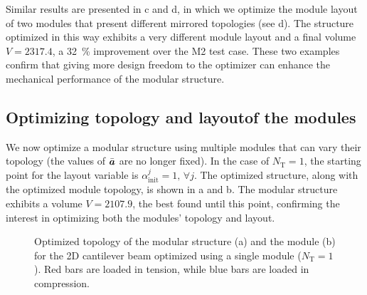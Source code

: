 Similar results are presented in c and d, in which we optimize the module layout of two modules that present different mirrored topologies (see d). The structure optimized in this way exhibits a very different module layout and a final volume $V = 2317.4$, a \qty{32}{\%} improvement over the M2 test case. These two examples confirm that giving more design freedom to the optimizer can enhance the mechanical performance of the modular structure.

\subsection{Optimizing topology and layoutof the modules}
We now optimize a modular structure using multiple modules that can vary their topology (the values of $\bar{\bm{a}}$ are no longer fixed). In the case of $N_\text{T}=1$, the starting point for the layout variable is $\alpha^j_\text{init}=1, \, \forall j$. The optimized structure, along with the optimized module topology, is shown in a and b. The modular structure exhibits a volume $V = 2107.9$, the best found until this point, confirming the interest in optimizing both the modules' topology and layout.

\begin{figure}
    \hspace*{\fill}
    \hfill
    \hspace*{\fill}
    \caption{Optimized topology of the modular structure (a) and the module (b) for the 2D cantilever beam optimized using a single module ($N_\text{T}=1$). Red bars are loaded in tension, while blue bars are loaded in compression.}
    \label{fig:06_module_topol_opt}
\end{figure}

